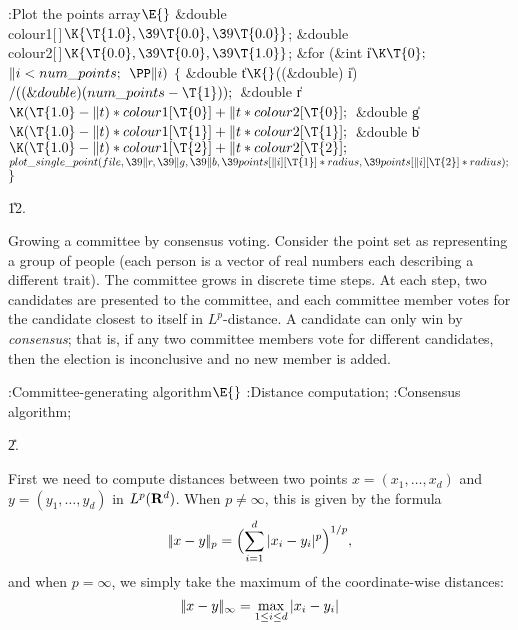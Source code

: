 \Y\B\4:Plot the points array\X${}\E{}$\6
\&{double} \\{colour1}[\,]${}\K\{\T{1.0},\39\T{0.0},\39\T{0.0}\}{}$;\6
\&{double} \\{colour2}[\,]${}\K\{\T{0.0},\39\T{0.0},\39\T{1.0}\}{}$;\7
\&{for} (\&{int} \|i${}\K\T{0};{}$ ${}\|i<\\{num\_points};{}$ ${}\PP\|i){}$\5
${}\{{}$\1\6
\&{double} \|t${}\K{}$((\&{double}) \|i)${}/((\&{double})(\\{num\_points}-%
\T{1}));{}$\6
\&{double} \|r${}\K(\T{1.0}-\|t)*\\{colour1}[\T{0}]+\|t*\\{colour2}[\T{0}];{}$\6
\&{double} \|g${}\K(\T{1.0}-\|t)*\\{colour1}[\T{1}]+\|t*\\{colour2}[\T{1}];{}$\6
\&{double} \|b${}\K(\T{1.0}-\|t)*\\{colour1}[\T{2}]+\|t*\\{colour2}[\T{2}];{}$\7
${}\\{plot\_single\_point}(\\{file},\39\|r,\39\|g,\39\|b,\39\\{points}[\|i][%
\T{1}]*\\{radius},\39\\{points}[\|i][\T{2}]*\\{radius});{}$\6
\4${}\}{}$\2\par
\U12.\fi

Growing a committee by consensus voting.
Consider the point set as representing a group of people (each person is a
vector of real numbers
each describing a different trait). The committee grows in discrete time steps.
At each step, two
candidates are presented to the committee, and each committee member votes for
the candidate closest
to itself in $L^p$-distance. A candidate can only win by {\it consensus}; that
is, if any two committee
members vote for different candidates, then the election is inconclusive and no
new member is added.

\Y\B\4:Committee-generating algorithm\X${}\E{}$\6
:Distance computation\X;\6
:Consensus algorithm\X;\par
\U2.\fi

First we need to compute distances between two points $x = (x_1,\ldots,
x_d)$
and $y = (y_1,\ldots, y_d)$ in $L^p({\bf R}^d)$. When $p\neq\infty$, this is given
by the formula
$$\vert\!\vert x-y\vert\!\vert_p = \Bigl(\sum_{i=1}^d \vert x_i-y_i\vert ^p\Bigr)^{1/p},$$
and when $p=\infty$, we simply take the maximum of the coordinate-wise
distances:
$$\vert\!\vert x-y\vert\!\vert_\infty = \max_{1\leq i\leq d} \vert x_i - y_i\vert$$

